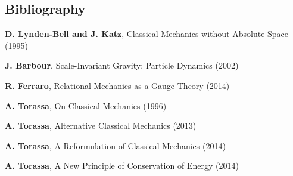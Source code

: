 \documentclass[10pt]{article}
\begin{document}
{\centering\subsection*{Bibliography}}

\vspace{+1.20em}

\par \textbf{D. Lynden-Bell and J. Katz}, Classical Mechanics without Absolute Space (1995)
\bigskip
\par \textbf{J. Barbour}, Scale-Invariant Gravity: Particle Dynamics (2002)
\bigskip
\par \textbf{R. Ferraro}, Relational Mechanics as a Gauge Theory (2014)
\bigskip
\par \textbf{A. Torassa}, On Classical Mechanics (1996)
\bigskip
\par \textbf{A. Torassa}, Alternative Classical Mechanics (2013)
\bigskip
\par \textbf{A. Torassa}, A Reformulation of Classical Mechanics (2014)
\bigskip
\par \textbf{A. Torassa}, A New Principle of Conservation of Energy (2014)

\newpage
\end{document}
